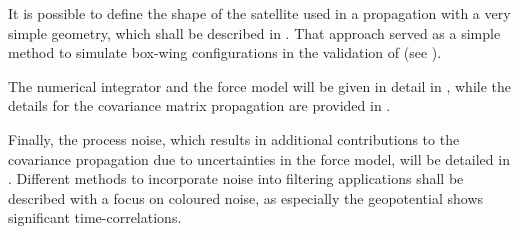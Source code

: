 It is possible to define the shape of the satellite used in a \neptune propagation with a very simple geometry, which shall be described in 
. That approach served as a simple method to simulate box-wing configurations in the validation of \neptune (see ).

The numerical integrator and the force model will be given in detail in , while the details for the covariance matrix propagation are provided in 
.

Finally, the process noise, which results in additional contributions to the covariance propagation due to uncertainties in the force model, will be detailed in . 
Different methods to incorporate noise into filtering applications shall be described with a focus on coloured noise, as especially the geopotential shows significant time-correlations.









%
%
